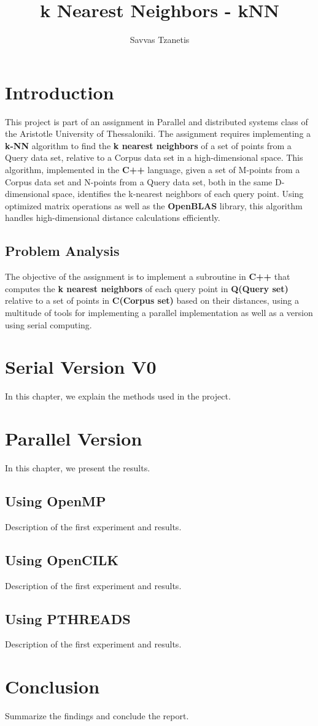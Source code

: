 \documentclass[12pt]{report}
\begin{document}
\title{\textbf{k Nearest Neighbors - kNN}}
\author{Savvas Tzanetis}
\maketitle  %

\tableofcontents  %

\chapter{Introduction}
This project is part of an assignment in Parallel and distributed systems class of the Aristotle University of Thessaloniki. The assignment requires implementing a \textbf{k-NN} algorithm to find the\textbf{ k nearest neighbors} of a set of points from a Query data set, relative to a Corpus data set in a high-dimensional space. This algorithm, implemented in the \textbf{C++} language, given a set of M-points from a Corpus data set and N-points from a Query data set, both in the same D-dimensional space, identifies the k-nearest neighbors of each query point. Using optimized matrix operations as well as the \textbf{OpenBLAS} library, this algorithm handles high-dimensional distance calculations efficiently.

\section{Problem Analysis}
The objective of the assignment is to implement a subroutine in \textbf{C++} that computes the \textbf{k nearest neighbors} of each query point in \textbf{Q(Query set)} relative to a set of points in \textbf{C(Corpus set)} based on their distances, using a multitude of tools for implementing a parallel implementation as well as a version using serial computing.

\chapter{Serial Version V0}
In this chapter, we explain the methods used in the project.

\chapter{Parallel Version}
In this chapter, we present the results.

\section{Using OpenMP}
Description of the first experiment and results.

\section{Using OpenCILK}
Description of the first experiment and results.

\section{Using PTHREADS}
Description of the first experiment and results.

\chapter{Conclusion}
Summarize the findings and conclude the report.
\end{document}
